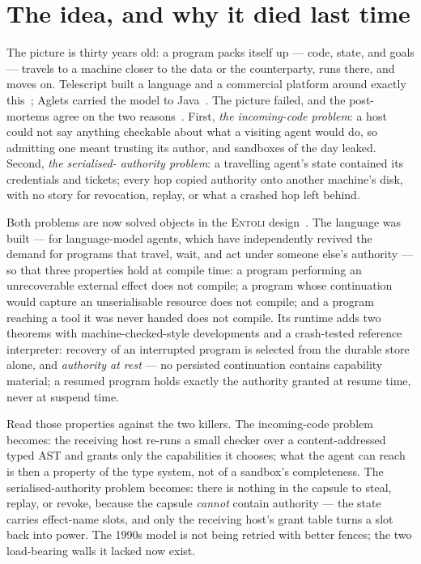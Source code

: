 \documentclass[sigplan,10pt]{acmart}
\begin{document}
\maketitle

\section{The idea, and why it died last time}

The picture is thirty years old: a program packs itself up --- code, state,
and goals --- travels to a machine closer to the data or the counterparty,
runs there, and moves on. Telescript built a language and a commercial
platform around exactly this~\cite{white1996telescript}; Aglets carried
the model to Java~\cite{lange1998aglets}. The picture failed, and the
post-mortems agree on the two reasons~\cite{chess1998mobile}. First,
\emph{the incoming-code problem}: a host could not say anything checkable
about what a visiting agent would do, so admitting one meant trusting its
author, and sandboxes of the day leaked. Second, \emph{the serialised-
authority problem}: a travelling agent's state contained its credentials
and tickets; every hop copied authority onto another machine's disk, with
no story for revocation, replay, or what a crashed hop left behind.

Both problems are now solved objects in the \textsc{Entoli}
design~\cite{entoli2026}. The language was built --- for language-model
agents, which have independently revived the demand for programs that
travel, wait, and act under someone else's authority --- so that three
properties hold at compile time: a program performing an unrecoverable
external effect does not compile; a program whose continuation would
capture an unserialisable resource does not compile; and a program
reaching a tool it was never handed does not compile. Its runtime adds
two theorems with machine-checked-style developments and a crash-tested
reference interpreter: recovery of an interrupted program is selected
from the durable store alone, and \emph{authority at rest} --- no
persisted continuation contains capability material; a resumed program
holds exactly the authority granted at resume time, never at suspend
time.

Read those properties against the two killers. The incoming-code problem
becomes: the receiving host re-runs a small checker over a
content-addressed typed AST and grants only the capabilities it chooses;
what the agent can reach is then a property of the type system, not of a
sandbox's completeness. The serialised-authority problem becomes: there
is nothing in the capsule to steal, replay, or revoke, because the
capsule \emph{cannot} contain authority --- the state carries effect-name
slots, and only the receiving host's grant table turns a slot back into
power. The 1990s model is not being retried with better fences; the two
load-bearing walls it lacked now exist.
\end{document}
